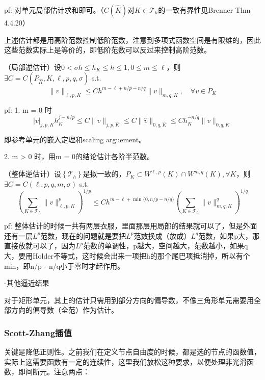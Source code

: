 pf: 对单元局部估计求和即可。（$C(\widehat{K})$对$K \in \mathcal{T}_{h}$的一致有界性见Brenner Thm 4.4.20）

上述估计都是用高阶范数控制低阶范数，注意到多项式函数空间是有限维的，因此这些范数实际上是等价的，即低阶范数可以反过来控制高阶范数。

\begin{lem}
  （局部逆估计）设$0 < \sigma h \le h_{K} \le h \le 1, 0 \le m \le \ell$，则$\exists C = C\left(P_{\widehat{K}}, \widehat{K}, \ell, p, q, \sigma\right)$ s.t.
  \[
    \|v\|_{\ell, p, K} \le C h^{m-\ell+n / p-n / q}\|v\|_{m, q, K}, \quad \forall v \in P_{K}
  \]
\end{lem}

pf: 1. m = 0 时
\[
  |v|_{j, p, K} h_{K}^{j-n / p} \le C\|\widehat{v}\|_{j, p, \widehat{K}} \le C\|\widehat{v}\|_{0, q, \widehat{K}} \le C h_{K}^{-n / q}\|v\|_{0, q, K}
\]

即参考单元的嵌入定理和scaling arguement。

2. m > 0 时，用m = 0的结论估计各阶半范数。

\begin{thm}
  （整体逆估计）设$\left\{\mathcal{T}_{h}\right\}$是拟一致的，$P_{K} \subset W^{\ell, p}(K) \cap W^{m, q}(K), \forall K$，则$\exists C=C(\ell, p, q, m, \sigma)$ s.t.
  \[
    \left(\sum_{K \in \mathcal{T}_{h}}\|v\|_{\ell, p, K}^{p}\right)^{1 / p} \le C h^{m-\ell+\min \{0, n / p-n / q\}}\left(\sum_{K \in \mathcal{T}_{h}}\|v\|_{m, q, K}^{q}\right)^{1 / q}
  \]
\end{thm}

pf: 整体估计的时候一共有两层衣服，里面那层用局部的结果就可以了，但是外面还有一层$L^p$范数，现在的问题就是要把$L^p$范数换成（放成）$L^q$范数，如果p大，那直接放就可以了，因为$L^p$范数的单调性，p越大，空间越大，范数越小，如果q大，要用H$\ddot{\text{o}}$lder不等式，这时候会出来一项把h的那个尾巴项抵消掉，所以有个min，即n/p - n/q小于零时才起作用。

-其他逼近结果

对于矩形单元，其上的估计只需用到部分方向的偏导数，不像三角形单元需要用全部方向的偏导数（全范）作为估计。

\subsubsection{Scott-Zhang插值}

关键是降低正则性。之前我们在定义节点自由度的时候，都是选的节点的函数值，实际上这需要函数有一定的连续性，这里我们放松这种要求，以便处理非光滑函数，即间断元。注意两点：

